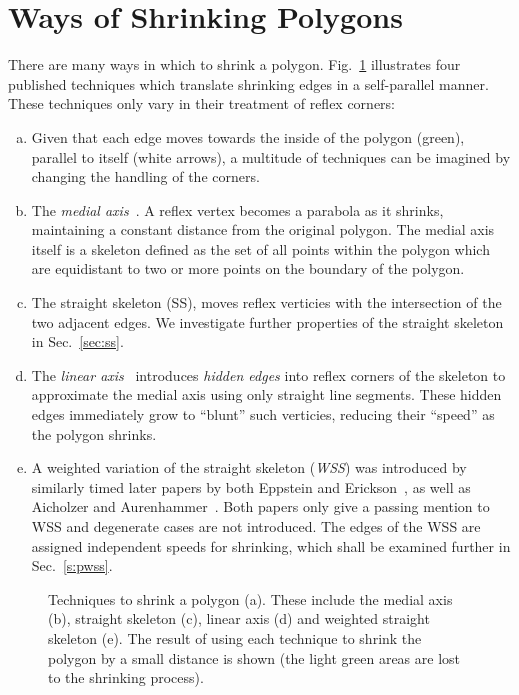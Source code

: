 \section{Ways of Shrinking Polygons}
\label{sec_ways_of_shrinking}
There are many ways in which to shrink a polygon. Fig.~\ref{fig:offset_types} illustrates four published techniques which translate shrinking edges in a self-parallel manner. These techniques only vary in their treatment of reflex corners:
\begin{enumerate}[a)]
\item  Given that each edge moves towards the inside of the polygon (green), parallel to itself (white arrows), a multitude of techniques can be imagined by changing the handling of the corners.
\item The \emph{medial axis}~\cite{Blum67}. A reflex vertex becomes a parabola as it shrinks, maintaining a constant distance from the original polygon. The medial axis itself is a skeleton defined as the set of all points within the polygon which are equidistant to two or more points on the boundary of the polygon.
\item The straight skeleton\cite{Aichholzer95} (SS), moves reflex verticies with the intersection of the two adjacent edges. We investigate further properties of the straight skeleton in Sec.~\ref{sec:ss}.
\item The \emph{linear axis}~\cite{Tuanase:2004} introduces \emph{hidden edges} into reflex corners of the skeleton to approximate the medial axis using only straight line segments. These hidden edges immediately grow to ``blunt'' such verticies, reducing their ``speed'' as the polygon shrinks.
\item A weighted variation of the straight skeleton (\emph{WSS}) was introduced by similarly timed later papers by both Eppstein and Erickson~\cite{Epp:98}, as well as Aicholzer and Aurenhammer~\cite{Aichholzer:1996:SKF}. Both papers only give a passing mention to WSS and degenerate cases are not introduced. The edges of the WSS are assigned independent speeds for shrinking, which shall be examined further in Sec.~\ref{s:pwss}.
\end{enumerate}

\begin{figure}[htb]
  \centering
  \def\svgwidth{1.\columnwidth}
  
  \caption[Different ways to shrink a polygon.]{\label{fig:offset_types}Techniques to shrink a polygon (a). These include the medial axis (b), straight skeleton (c), linear axis (d) and weighted straight skeleton (e). The result of using each technique to shrink the polygon by a small distance is shown (the light green areas are lost to the shrinking process).}
\end{figure}

